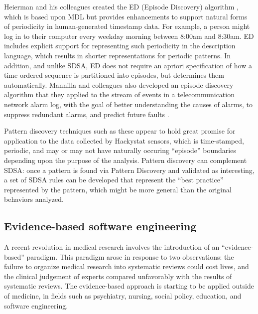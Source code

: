Heierman and his colleagues created the ED (Episode Discovery) algorithm
\cite{Heierman04}, which is based upon MDL but provides enhancements to
support natural forms of periodicity in human-generated timestamp data.
For example, a person might log in to their computer every weekday morning
between 8:00am and 8:30am.  ED includes explicit support for representing
such periodicity in the description language, which results in shorter
representations for periodic patterns. In addition, and unlike SDSA, ED
does not require an apriori specification of how a time-ordered sequence is
partitioned into episodes, but determines them automatically.  Mannilla and
colleagues also developed an episode discovery algorithm that they applied
to the stream of events in a telecommunication network alarm log, with the
goal of better understanding the causes of alarms, to suppress redundant
alarms, and predict future faults \cite{Mannila95}.  

Pattern discovery techniques such as these appear to hold great promise for
application to the data collected by Hackystat sensors, which is
time-stamped, periodic, and may or may not have naturally occuring
``episode'' boundaries depending upon the purpose of the analysis.  Pattern
discovery can complement SDSA: once a pattern is found via Pattern
Discovery and validated as interesting, a set of SDSA rules can be
developed that represent the ``best practice'' represented by the pattern,
which might be more general than the original behaviors analyzed.

\subsection{Evidence-based software engineering}

A recent revolution in medical research involves the introduction of an
``evidence-based'' paradigm.  This paradigm arose in response to two
observations: the failure to organize medical research into systematic
reviews could cost lives, and the clinical judgement of experts compared
unfavorably with the results of systematic reviews.   The evidence-based 
approach is starting to be applied outside of medicine, in fields such as
psychiatry, nursing, social policy, education, and software engineering. 

